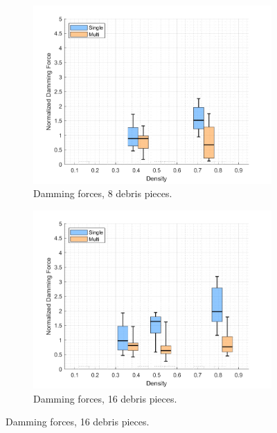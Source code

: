 \documentclass{article}
\begin{document}
\begin{figure}[htbp]
    \centering
    \begin{subfigure}[b]{0.32\textwidth}
        \centering
        \includegraphics[width=\textwidth]{Boxplot_Density_vs_Damming_8Debris.png}
        \caption{Damming forces, 8 debris pieces.}
        \label{fig:boxplot_damming_8}
    \end{subfigure}
    \hfill
    \begin{subfigure}[b]{0.32\textwidth}
        \centering
        \includegraphics[width=\textwidth]{Boxplot_Density_vs_Damming_16Debris.png}
        \caption{Damming forces, 16 debris pieces.}
        \label{fig:boxplot_damming_16}
    \end{subfigure}

\end{figure}
\end{document}
